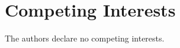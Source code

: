 \documentclass[sn-apa]{sn-jnl}%
\theoremstyle{thmstyleone}%
\theoremstyle{thmstyletwo}%
\theoremstyle{thmstylethree}%
\begin{document}
\section*{Competing Interests}

The authors declare no competing interests.





\printbibliography
\end{document}
